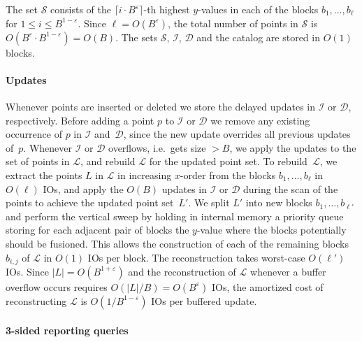 \documentclass[11pt]{article}
\begin{document}
The set $\mathcal{S}$ consists of the $\lceil i\cdot
B^{\varepsilon}\rceil$-th highest $y$-values in each of the blocks
$b_1,\ldots,b_\ell$ for $1\leq i\leq B^{1-\varepsilon}$. Since
$\ell=O(B^\varepsilon)$, the total number of points in $\mathcal{S}$
is $O(B^\varepsilon\cdot B^{1-\varepsilon})=O(B)$.
%
The sets $\mathcal{S}$, $\mathcal{I}$, $\mathcal{D}$ and the catalog
are stored in $O(1)$ blocks.

\paragraph*{Updates}

Whenever points are inserted or deleted we store the delayed updates
in $\mathcal{I}$ or $\mathcal{D}$, respectively.  Before adding a
point $p$ to $\mathcal{I}$ or $\mathcal{D}$ we remove any existing
occurrence of $p$ in $\mathcal{I}$ and~$\mathcal{D}$, since the new
update overrides all previous updates of~$p$.  Whenever $\mathcal{I}$
or $\mathcal{D}$ overflows, i.e.\ gets size $>B$, we apply the updates
to the set of points in $\mathcal{L}$, and rebuild $\mathcal{L}$ for
the updated point set.
% 
To rebuild~$\mathcal{L}$, we extract the points $L$ in $\mathcal{L}$
in increasing $x$-order from the blocks $b_1,\ldots,b_\ell$ in
$O(\ell)$ IOs, and apply the $O(B)$ updates in $\mathcal{I}$ or
$\mathcal{D}$ during the scan of the points to achieve the updated
point set~$L'$. We split $L'$ into new blocks $b_1,\ldots,b_{\ell'}$
and perform the vertical sweep by holding in internal memory a
priority queue storing for each adjacent pair of blocks the $y$-value
where the blocks potentially should be fusioned.  This allows the
construction of each of the remaining blocks~$b_{i,j}$ of
$\mathcal{L}$ in $O(1)$ IOs per block.  The reconstruction takes
worst-case $O(\ell')$ IOs. Since $|L|=O(B^{1+\varepsilon})$ and the
reconstruction of $\mathcal{L}$ whenever a buffer overflow occurs
requires $O(|L|/B)=O(B^\varepsilon)$ IOs, the amortized cost of
reconstructing $\mathcal{L}$ is $O(1/B^{1-\varepsilon})$ IOs per
buffered update.

\paragraph*{3-sided reporting queries}
\end{document}
